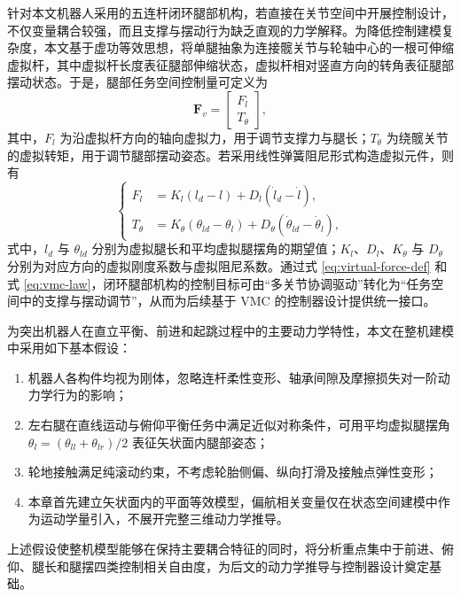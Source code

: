 针对本文机器人采用的五连杆闭环腿部机构，若直接在关节空间中开展控制设计，不仅变量耦合较强，而且支撑与摆动行为缺乏直观的力学解释。为降低控制建模复杂度，本文基于虚功等效思想，将单腿抽象为连接髋关节与轮轴中心的一根可伸缩虚拟杆，其中虚拟杆长度表征腿部伸缩状态，虚拟杆相对竖直方向的转角表征腿部摆动状态。于是，腿部任务空间控制量可定义为
\begin{equation}
  \boldsymbol{F}_v =
  \begin{bmatrix}
    F_l \\
    T_\theta
  \end{bmatrix},
  \label{eq:virtual-force-def}
\end{equation}
其中，$F_l$ 为沿虚拟杆方向的轴向虚拟力，用于调节支撑力与腿长；$T_\theta$ 为绕髋关节的虚拟转矩，用于调节腿部摆动姿态。若采用线性弹簧阻尼形式构造虚拟元件，则有
\begin{equation}
  \left\{
    \begin{aligned}
      F_l      &= K_l (l_d - l) + D_l (\dot{l}_d - \dot{l}), \\
      T_\theta &= K_\theta (\theta_{ld} - \theta_l) + D_\theta (\dot{\theta}_{ld} - \dot{\theta}_l),
    \end{aligned}
  \right.
  \label{eq:vmc-law}
\end{equation}
式中，$l_d$ 与 $\theta_{ld}$ 分别为虚拟腿长和平均虚拟腿摆角的期望值；$K_l$、$D_l$、$K_\theta$ 与 $D_\theta$ 分别为对应方向的虚拟刚度系数与虚拟阻尼系数。通过式 \eqref{eq:virtual-force-def} 和式 \eqref{eq:vmc-law}，闭环腿部机构的控制目标可由“多关节协调驱动”转化为“任务空间中的支撑与摆动调节”，从而为后续基于 VMC 的控制器设计提供统一接口。

为突出机器人在直立平衡、前进和起跳过程中的主要动力学特性，本文在整机建模中采用如下基本假设：
\begin{enumerate}
  \item 机器人各构件均视为刚体，忽略连杆柔性变形、轴承间隙及摩擦损失对一阶动力学行为的影响；
  \item 左右腿在直线运动与俯仰平衡任务中满足近似对称条件，可用平均虚拟腿摆角 $\theta_l = (\theta_{ll} + \theta_{lr})/2$ 表征矢状面内腿部姿态；
  \item 轮地接触满足纯滚动约束，不考虑轮胎侧偏、纵向打滑及接触点弹性变形；
  \item 本章首先建立矢状面内的平面等效模型，偏航相关变量仅在状态空间建模中作为运动学量引入，不展开完整三维动力学推导。
\end{enumerate}

上述假设使整机模型能够在保持主要耦合特征的同时，将分析重点集中于前进、俯仰、腿长和腿摆四类控制相关自由度，为后文的动力学推导与控制器设计奠定基础。

